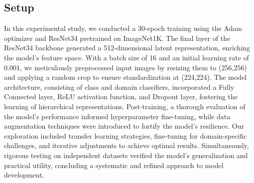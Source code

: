 \documentclass[sigconf,authordraft]{acmart}
\begin{document}
\subsection{Setup}
In this experimental study, we conducted a 30-epoch training using the Adam optimizer and ResNet34 pretrained on ImageNet1K. The final layer of the ResNet34 backbone generated a 512-dimensional latent representation, enriching the model's feature space. With a batch size of 16 and an initial learning rate of 0.001, we meticulously preprocessed input images by resizing them to (256,256) and applying a random crop to ensure standardization at (224,224). The model architecture, consisting of class and domain classifiers, incorporated a Fully Connected layer, ReLU activation function, and Dropout layer, fostering the learning of hierarchical representations. Post-training, a thorough evaluation of the model's performance informed hyperparameter fine-tuning, while data augmentation techniques were introduced to fortify the model's resilience. Our exploration included transfer learning strategies, fine-tuning for domain-specific challenges, and iterative adjustments to achieve optimal results. Simultaneously, rigorous testing on independent datasets verified the model's generalization and practical utility, concluding a systematic and refined approach to model development.
\end{document}
